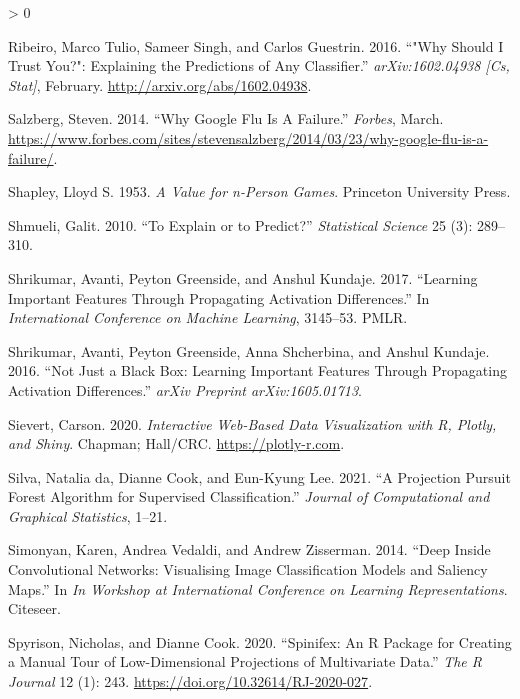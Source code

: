 \documentclass[
]{article}
\newlength{\cslhangindent}
\newenvironment{CSLReferences}[2] %
 {%
  \setlength{\parindent}{0pt}
  \ifodd #1 \everypar{\setlength{\hangindent}{\cslhangindent}}\ignorespaces\fi
  \ifnum #2 > 0
  \setlength{\parskip}{#2\baselineskip}
  \fi
 }%
 {}
\begin{document}
\begin{CSLReferences}{1}{0}
\leavevmode\hypertarget{ref-ribeiro_why_2016}{}%
Ribeiro, Marco Tulio, Sameer Singh, and Carlos Guestrin. 2016. {``"{Why} {Should} {I} {Trust} {You}?": {Explaining} the {Predictions} of {Any} {Classifier}.''} \emph{arXiv:1602.04938 {[}Cs, Stat{]}}, February. \url{http://arxiv.org/abs/1602.04938}.

\leavevmode\hypertarget{ref-salzberg_why_2014}{}%
Salzberg, Steven. 2014. {``Why {Google} {Flu} {Is} {A} {Failure}.''} \emph{Forbes}, March. \url{https://www.forbes.com/sites/stevensalzberg/2014/03/23/why-google-flu-is-a-failure/}.

\leavevmode\hypertarget{ref-shapley_value_1953}{}%
Shapley, Lloyd S. 1953. \emph{A Value for n-Person Games}. Princeton University Press.

\leavevmode\hypertarget{ref-shmueli_explain_2010}{}%
Shmueli, Galit. 2010. {``To Explain or to Predict?''} \emph{Statistical Science} 25 (3): 289--310.

\leavevmode\hypertarget{ref-shrikumar_learning_2017}{}%
Shrikumar, Avanti, Peyton Greenside, and Anshul Kundaje. 2017. {``Learning Important Features Through Propagating Activation Differences.''} In \emph{International {Conference} on {Machine} {Learning}}, 3145--53. PMLR.

\leavevmode\hypertarget{ref-shrikumar_not_2016}{}%
Shrikumar, Avanti, Peyton Greenside, Anna Shcherbina, and Anshul Kundaje. 2016. {``Not Just a Black Box: {Learning} Important Features Through Propagating Activation Differences.''} \emph{arXiv Preprint arXiv:1605.01713}.

\leavevmode\hypertarget{ref-sievert_interactive_2020}{}%
Sievert, Carson. 2020. \emph{Interactive {Web}-{Based} {Data} {Visualization} with {R}, Plotly, and Shiny}. Chapman; Hall/CRC. \url{https://plotly-r.com}.

\leavevmode\hypertarget{ref-da_silva_projection_2021}{}%
Silva, Natalia da, Dianne Cook, and Eun-Kyung Lee. 2021. {``A {Projection} {Pursuit} {Forest} {Algorithm} for {Supervised} {Classification}.''} \emph{Journal of Computational and Graphical Statistics}, 1--21.

\leavevmode\hypertarget{ref-simonyan_deep_2014}{}%
Simonyan, Karen, Andrea Vedaldi, and Andrew Zisserman. 2014. {``Deep Inside Convolutional Networks: {Visualising} Image Classification Models and Saliency Maps.''} In \emph{In {Workshop} at {International} {Conference} on {Learning} {Representations}}. Citeseer.

\leavevmode\hypertarget{ref-spyrison_spinifex_2020}{}%
Spyrison, Nicholas, and Dianne Cook. 2020. {``Spinifex: An {R} {Package} for {Creating} a {Manual} {Tour} of {Low}-Dimensional {Projections} of {Multivariate} {Data}.''} \emph{The R Journal} 12 (1): 243. \url{https://doi.org/10.32614/RJ-2020-027}.


\end{CSLReferences}
\end{document}
